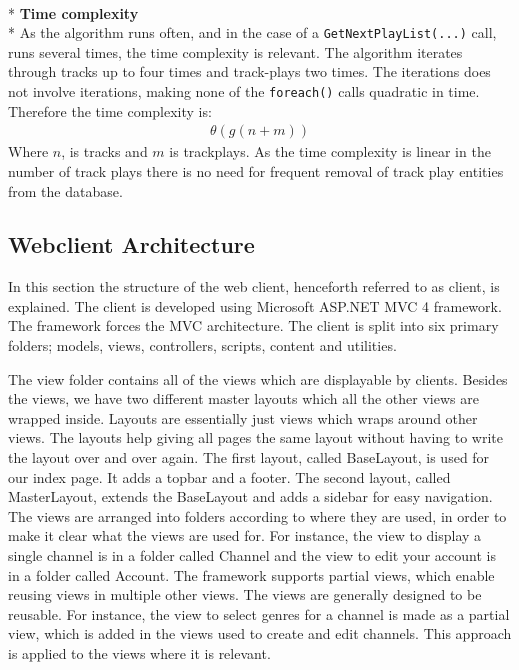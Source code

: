 \documentclass[a4paper,11pt,report]{article}
\begin{document}
\textbf{ } \\*
\textbf{Time complexity} \\*
As the algorithm runs often, and in the case of a \texttt{GetNextPlayList(...)} call, runs several times, the time complexity is relevant. The algorithm iterates through tracks up to four times and track-plays two times. The iterations does not involve iterations, making none of the \texttt{foreach()} calls quadratic in time. Therefore the time complexity is: 
\begin{align*}
\theta (g(n + m))
\end{align*}
Where \begin{math}n\end{math}, is tracks and \begin{math}m\end{math} is trackplays. As the time complexity is linear in the number of track plays there is no need for frequent removal of track play entities from the database.

\subsection{Webclient Architecture}
In this section the structure of the web client, henceforth referred to as client, is explained.
The client is developed using Microsoft ASP.NET MVC 4 framework. The framework forces the MVC architecture.
The client is split into six primary folders; models, views, controllers, scripts, content and utilities.

The view folder contains all of the views which are displayable by clients. Besides the views, we have two different master layouts which all the other views are wrapped inside. Layouts are essentially just views which wraps around other views.
The layouts help giving all pages the same layout without having to write the layout over and over again. The first layout, called BaseLayout, is used for our index page. It adds a topbar and a footer. The second layout, called MasterLayout, extends the BaseLayout and adds a sidebar for easy navigation.
The views are arranged into folders according to where they are used, in order to make it clear what the views are used for. For instance, the view to display a single channel is in a folder called Channel and the view to edit your account is in a folder called Account.
The framework supports partial views, which enable reusing views in multiple other views.
The views are generally designed to be reusable. For instance, the view to select genres for a channel is made as a partial view, which is added in the views used to create and edit channels. This approach is applied to the views where it is relevant.
\end{document}
